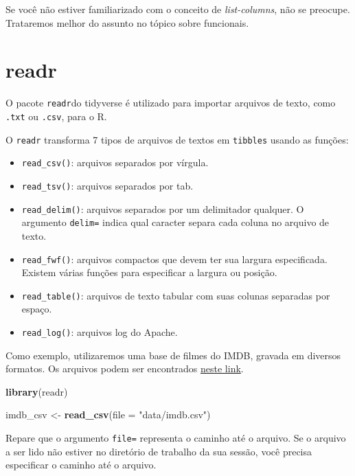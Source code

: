 \documentclass[
]{book}
\newenvironment{Shaded}{\begin{snugshade}}{\end{snugshade}}
\newcommand{\DataTypeTok}[1]{\textcolor[rgb]{0.13,0.29,0.53}{#1}}
\newcommand{\KeywordTok}[1]{\textcolor[rgb]{0.13,0.29,0.53}{\textbf{#1}}}
\newcommand{\NormalTok}[1]{#1}
\newcommand{\StringTok}[1]{\textcolor[rgb]{0.31,0.60,0.02}{#1}}
\providecommand{\tightlist}{%
  \setlength{\itemsep}{0pt}\setlength{\parskip}{0pt}}
\begin{document}
Se você não estiver familiarizado com o conceito de \emph{list-columns}, não se preocupe. Trataremos melhor do assunto no tópico sobre funcionais.

\hypertarget{readr}{%
\section{readr}\label{readr}}

O pacote \texttt{readr}do tidyverse é utilizado para importar arquivos de texto, como \texttt{.txt} ou \texttt{.csv}, para o R.

O \texttt{readr} transforma 7 tipos de arquivos de textos em \texttt{tibbles} usando as funções:

\begin{itemize}
\tightlist
\item
  \texttt{read\_csv()}: arquivos separados por vírgula.
\item
  \texttt{read\_tsv()}: arquivos separados por tab.
\item
  \texttt{read\_delim()}: arquivos separados por um delimitador qualquer. O argumento \texttt{delim=} indica qual caracter separa cada coluna no arquivo de texto.
\item
  \texttt{read\_fwf()}: arquivos compactos que devem ter sua largura especificada. Existem várias funções para especificar a largura ou posição.
\item
  \texttt{read\_table()}: arquivos de texto tabular com suas colunas separadas por espaço.
\item
  \texttt{read\_log()}: arquivos log do Apache.
\end{itemize}

Como exemplo, utilizaremos uma base de filmes do IMDB, gravada em diversos formatos. Os arquivos podem ser encontrados \href{https://github.com/curso-r/site-v2/raw/master/content/material/importacao/data/imdb.rds}{neste link}.

\begin{Shaded}
\begin{Highlighting}[]
\KeywordTok{library}\NormalTok{(readr)}

\NormalTok{imdb_csv <-}\StringTok{ }\KeywordTok{read_csv}\NormalTok{(}\DataTypeTok{file =} \StringTok{"data/imdb.csv"}\NormalTok{)}
\end{Highlighting}
\end{Shaded}

Repare que o argumento \texttt{file=} representa o caminho até o arquivo. Se o arquivo a ser lido não estiver no diretório de trabalho da sua sessão, você precisa especificar o caminho até o arquivo.
\end{document}

